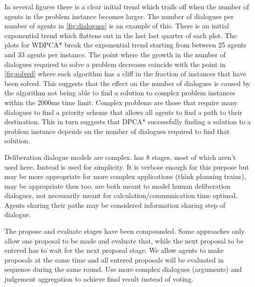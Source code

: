 In several figures there is a clear initial trend which trails off when the
number of agents in the problem instance becomes larger. The number of
dialogues per number of agents in \autoref{fig:dialogues} is an example of
this. There is an initial exponential trend which flattens out in the last last
quarter of each plot. The plots for WDPCA* break the exponential trend starting
from between 25 agents and 33 agents per instance. The point where the growth
in the number of dialogues required to solve a problem decreases coincide with
the point in \autoref{fig:solved} where each algorithm has a cliff in the
fraction of instances that have been solved. This suggests that the effect on
the number of dialogues is caused by the algorithm not being able to find a
solution to complex problem instances within the 2000ms time limit. Complex
problems are those that require many dialogues to find a priority scheme that
allows all agents to find a path to their destination. This in turn suggests
that DPCA* successfully finding a solution to a problem instance depends on the
number of dialogues required to find that solution.

Deliberation dialogue models are complex. \cite{mcburney2007} has 8 stages,
most of which aren't used here. Instead \cite{dunin-keplicz2011} is used for
simplicity. It is verbose enough for this purpose but \cite{mcburney2007} may
be more appropriate for more complex applications (think planning trains),
\cite{walton2014} may be appropriate then too. \cite{mcburney2007,walton2014}
are both meant to model human deliberation dialogues, not necessarily meant for
calculation/communication time optimal. Agents sharing their paths may be
considered information sharing step of dialogue.

The propose and evaluate stages have been compounded. Some approaches only
allow one proposal to be made and evaluate that, while the next proposal to be
entered has to wait for the next proposal stage. We allow agents to make
proposals at the same time and all entered proposals will be evaluated in
sequence during the same round. Use more complex dialogues (arguments) and
judgement aggregation to achieve final result instead of voting.